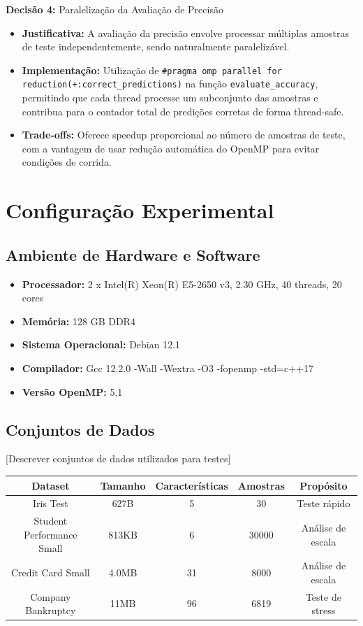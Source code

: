 \documentclass[a4paper,11pt]{article}
\begin{document}
\textbf{Decisão 4:} Paralelização da Avaliação de Precisão
\begin{itemize}
    \item \textbf{Justificativa:} A avaliação da precisão envolve processar múltiplas amostras de teste independentemente, sendo naturalmente paralelizável.
    \item \textbf{Implementação:} Utilização de \texttt{\#pragma omp parallel for reduction(+:correct\_predictions)} na função \texttt{evaluate\_accuracy}, permitindo que cada thread processe um subconjunto das amostras e contribua para o contador total de predições corretas de forma thread-safe.
    \item \textbf{Trade-offs:} Oferece speedup proporcional ao número de amostras de teste, com a vantagem de usar redução automática do OpenMP para evitar condições de corrida.
\end{itemize}

\section{Configuração Experimental}

\subsection{Ambiente de Hardware e Software}
\begin{itemize}
    \item \textbf{Processador:} 2 x Intel(R) Xeon(R) E5-2650 v3, 2.30 GHz, 40 threads, 20 cores
    \item \textbf{Memória:} 128 GB DDR4
    \item \textbf{Sistema Operacional:} Debian 12.1
    \item \textbf{Compilador:} Gcc 12.2.0 -Wall -Wextra -O3 -fopenmp -std=c++17
    \item \textbf{Versão OpenMP:} 5.1
\end{itemize}

\subsection{Conjuntos de Dados}
[Descrever conjuntos de dados utilizados para testes]

\begin{table}[H]
\centering
\begin{tabular}{|c|c|c|c|c|}
\hline
\textbf{Dataset} & \textbf{Tamanho} & \textbf{Características} & \textbf{Amostras} & \textbf{Propósito} \\
\hline
Iris Test & 627B & 5 & 30 & Teste rápido \\
\hline
Student Performance Small & 813KB & 6 & 30000 & Análise de escala \\
\hline
Credit Card Small & 4.0MB & 31 & 8000 & Análise de escala \\
\hline
Company Bankruptcy & 11MB & 96 & 6819 & Teste de stress \\
\hline
\end{tabular}
\end{table}
\end{document}
